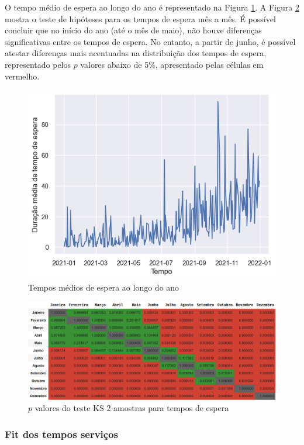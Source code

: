 O tempo médio de espera ao longo do ano é representado na Figura \ref*{fig: espera-tempo}. A Figura \ref*{fig: KS_wait} mostra o teste de hipóteses para os tempos de espera mês a mês. É possível concluir que no início do ano (até o mês de maio), não houve diferenças significativas entre os tempos de espera. No entanto, a partir de junho, é possível atestar diferenças mais acentuadas na distribuição dos tempos de espera, representado pelos $p$ valores abaixo de 5\%, apresentado pelas células em vermelho.

\begin{figure}[H]
    \includegraphics{analise-de-dados/anual/service.png}
    \caption{Tempos médios de espera ao longo do ano}
    \label{fig: espera-tempo}
\end{figure}

\begin{figure}[H]
    \includegraphics[scale=0.55]{analise-de-dados/anual/ks-wait.png}
    \caption{$p$ valores do teste KS 2 amostras para tempos de espera}
    \label{fig: KS_wait}
\end{figure}

\subsubsection{Fit dos tempos serviços}
